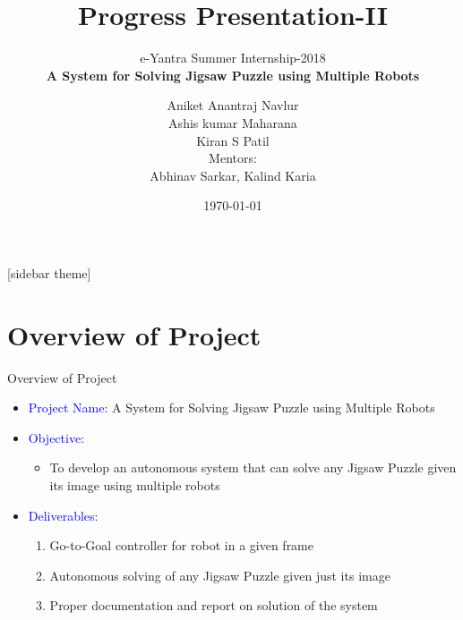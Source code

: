 \documentclass[10pt,a4paper]{beamer}
\begin{document}
	\title{Progress Presentation-II}
	\subtitle{e-Yantra Summer Internship-2018 \\ $ $\textbf{A System for Solving Jigsaw Puzzle using Multiple Robots}$ $}
	\author{$ $Aniket Anantraj Navlur$ $\\$ $Ashis kumar Maharana$ $\\$ $Kiran S Patil$ $\\ \vspace{1em}
	Mentors: \\$ $Abhinav Sarkar, Kalind Karia$ $}
	\date{\today}
	\frame{\titlepage}

[sidebar theme]
\section{Overview of Project}
\begin{frame}{Overview of Project}
	
	\begin{itemize}
		\item \textcolor{blue}{Project Name:} A System for Solving Jigsaw Puzzle using Multiple Robots
		\item \textcolor{blue}{Objective:}
		\begin{itemize}
			\item To develop an autonomous system that can solve any Jigsaw Puzzle given its image using multiple robots 
		\end{itemize}
		\item \textcolor{blue}{Deliverables:}
		\begin{enumerate}
			\item Go-to-Goal controller for robot in a given frame
			\item Autonomous solving of any Jigsaw Puzzle given just its image
			\item Proper documentation and report on solution of the system
		\end{enumerate}
	\end{itemize}
\end{frame}
\end{document}
